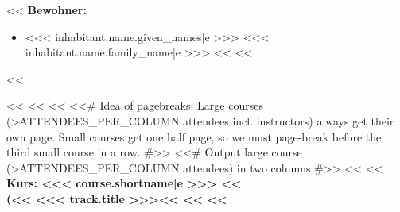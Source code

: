         \setlength{\columnsep}{2cm}
        \begin{minipage}[t]{0.5\textwidth}
            <<%
                {
                    \headingfamily\bfseries Bewohner:
                }
                \begin{itemize}
                    <<%
                            if inhabitant.parts[part].status == ENUMS.RegistrationPartStati.participant -%
                        \item <<< inhabitant.name.given_names|e >>> <<< inhabitant.name.family_name|e >>>
                            <<%
                    <<%
                \end{itemize}
            <<%
        \end{minipage}%
        <<%
        <<%
            <<%
            <<# Idea of pagebreaks: Large courses (>ATTENDEES_PER_COLUMN attendees incl. instructors) always get their
                own page. Small courses get one half page, so we must page-break before the third small course in a row.
                #>>
            <<# Output large course (>ATTENDEES_PER_COLUMN attendees) in two columns #>>
            <<%
                <<%
                {\headingfamily\bfseries
                    Kurs: <<< course.shortname|e >>>
                    <<%
                        \\\mdseries
                        (<<%
                            <<< track.title >>><<%
                         <<%
                    <<%
                    \vspace{0.6\baselineskip}
                }

